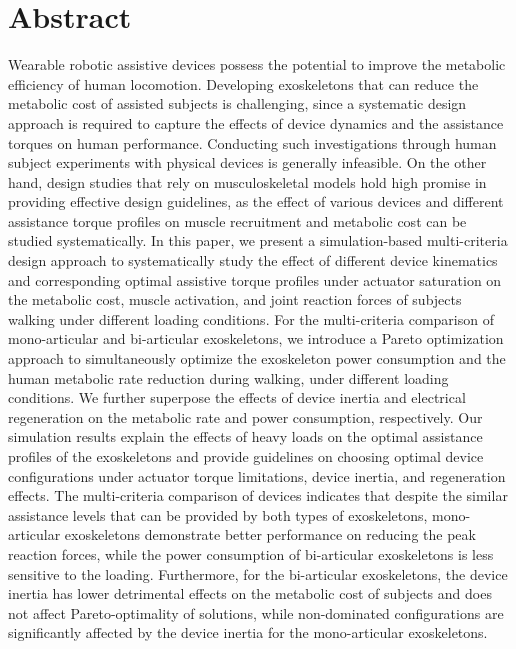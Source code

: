 \documentclass[10pt,letterpaper]{article}
\begin{document}
\section*{Abstract}
Wearable robotic assistive devices possess the potential to improve the metabolic efficiency of human locomotion. Developing exoskeletons that can reduce the metabolic cost of assisted subjects is challenging, since a systematic design approach is required to capture the effects of device dynamics and the assistance torques on human performance. Conducting such investigations through human subject experiments with physical devices is generally infeasible. On the other hand, design studies that rely on musculoskeletal models hold high promise in providing effective design guidelines, as the effect of various devices and different assistance torque profiles on muscle recruitment and metabolic cost can be studied systematically. In this paper, we present a simulation-based multi-criteria design approach to systematically study the effect of different device kinematics and corresponding optimal assistive torque profiles under actuator saturation on the metabolic cost, muscle activation, and joint reaction forces of subjects walking under different loading conditions. For the multi-criteria comparison of mono-articular and bi-articular exoskeletons, we introduce a Pareto optimization approach to simultaneously optimize the exoskeleton power consumption and the human metabolic rate reduction during walking, under different loading conditions. We further superpose the effects of device inertia and electrical regeneration on the metabolic rate and power consumption, respectively.  Our simulation results explain the effects of heavy loads on the optimal assistance profiles of the exoskeletons and provide guidelines on choosing optimal device configurations under actuator torque limitations, device inertia, and regeneration effects. The multi-criteria comparison of devices indicates that despite the similar assistance levels that can be provided by both types of exoskeletons, mono-articular exoskeletons demonstrate better performance on reducing the peak reaction forces, while the power consumption of bi-articular exoskeletons is less sensitive to the loading. Furthermore, for the bi-articular exoskeletons, the device inertia has lower detrimental effects on the metabolic cost of subjects and does not affect Pareto-optimality of solutions, while non-dominated configurations are significantly affected by the device inertia for the mono-articular exoskeletons.
\end{document}
